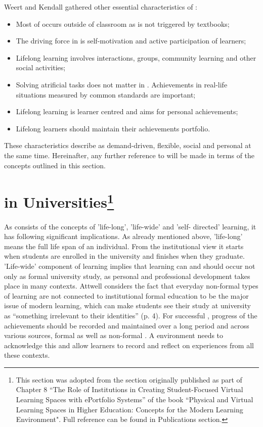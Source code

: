 Weert and Kendall \citeyearpar{Kendall2004} gathered other essential
characteristics of \LLLsn:

\begin{itemize}
  \item Most of \LLLs occurs outside of classroom as is not triggered by
  textbooks;
  \item The driving force in \LLLs is self-motivation and active participation
  of learners;
  \item Lifelong learning involves interactions, groups, community learning and
  other social activities;
  \item Solving atrificial tasks does not matter in \LLLsn. Achievements in
  real-life situations measured by common standards are important;
  \item Lifelong learning is learner centred and aims for personal
  achievements;
  \item Lifelong learners should maintain their achievements portfolio.
\end{itemize} 

These characteristics describe \LLLs as demand-driven, flexible, social and
personal at the same time. Hereinafter, any further reference to \LLLs will be
made in terms of the concepts outlined in this section.

\section[\LLLc in Universities]{\LLLc in Universities\footnote{This section was
adopted from the section originally published as part of Chapter 8 ``The Role of
Institutions in Creating Student-Focused Virtual Learning Spaces with ePortfolio
Systems'' of the book ``Physical and Virtual Learning Spaces in Higher
Education: Concepts for the Modern Learning Environment". Full reference can be
found in Publications section.} }

\label{sec:uni}

As \LLLs consists of the concepts of 'life-long', 'life-wide' and 'self-
directed' learning, it has following significant implications. As already
mentioned above, 'life-long' means the full life span of an individual. From the
institutional view it starts when students are enrolled in the university and
finishes when they graduate. 'Life-wide' component of learning implies that
learning can and should occur not only as formal university study, as personal
and professional development takes place in many contexts. Attwell
\citeyearpar{Attwell2007} considers the fact that everyday non-formal types of
learning are not connected to institutional formal education to be the major
issue of modern learning, which can make students see their study at university
as ``something irrelevant to their identities'' (p. 4). For successful \LLLs,
progress of the achievements should be recorded and maintained over a long
period and across various sources, formal as well as non-formal \citep{Kay2008}.
A \LLLs environment needs to acknowledge this and allow learners to record and
reflect on experiences from all these contexts.

